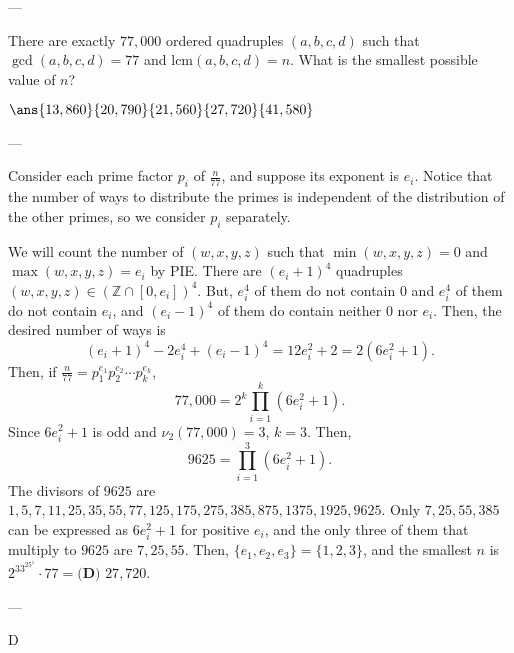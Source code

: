 
---

There are exactly $77,000$ ordered quadruples $(a,b,c,d)$ such that $\gcd(a,b,c,d)=77$ and $\text{lcm}(a,b,c,d)=n$. What is the smallest possible value of $n$?

$\ans{13,860}{20,790}{21,560}{27,720}{41,580}$

---

Consider each prime factor $p_i$ of $\frac{n}{77}$, and suppose its exponent is $e_i$. Notice that the number of ways to distribute the primes is independent of the distribution of the other primes, so we consider $p_i$ separately.

We will count the number of $(w,x,y,z)$ such that $\min(w,x,y,z)=0$ and $\max(w,x,y,z)=e_i$ by PIE. There are $(e_i+1)^4$ quadruples $(w,x,y,z)\in(\mathbb{Z}\cap[0,e_i])^4$. But, $e_i^4$ of them do not contain $0$ and $e_i^4$ of them do not contain $e_i$, and $(e_i-1)^4$ of them do contain neither $0$ nor $e_i$. Then, the desired number of ways is \[(e_i+1)^4-2e_i^4+(e_i-1)^4=12e_i^2+2=2(6e_i^2+1).\]
Then, if $\frac{n}{77}=p_1^{e_1}p_2^{e_2}\cdots p_k^{e_k}$, \[77,000=2^k\prod_{i=1}^k(6e_i^2+1).\]
Since $6e_i^2+1$ is odd and $\nu_2(77,000)=3$, $k=3$. Then, \[9625=\prod_{i=1}^3(6e_i^2+1).\]
The divisors of $9625$ are $1,5,7,11,25,35,55,77,125,175,275,385,875,1375,1925,9625$. Only $7,25,55,385$ can be expressed as $6e_i^2+1$ for positive $e_i$, and the only three of them that multiply to $9625$ are $7,25,55$. Then, $\{e_1,e_2,e_3\}=\{1,2,3\}$, and the smallest $n$ is $2^33^25^1\cdot 77=\boxed{\textbf{(D) }27,720}$.

---

D
